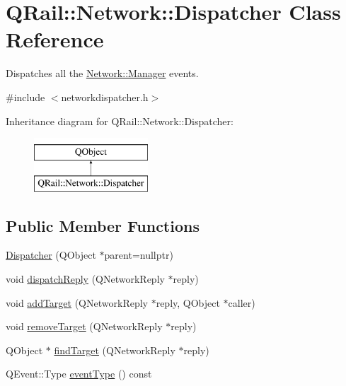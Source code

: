 \hypertarget{classQRail_1_1Network_1_1Dispatcher}{}\section{Q\+Rail\+::Network\+::Dispatcher Class Reference}
\label{classQRail_1_1Network_1_1Dispatcher}


Dispatches all the \mbox{\hyperlink{classQRail_1_1Network_1_1Manager}{Network\+::\+Manager}} events.  




{\ttfamily \#include $<$networkdispatcher.\+h$>$}

Inheritance diagram for Q\+Rail\+::Network\+::Dispatcher\+:\begin{figure}[H]
\begin{center}
\leavevmode
\includegraphics[height=2.000000cm]{classQRail_1_1Network_1_1Dispatcher}
\end{center}
\end{figure}
\subsection*{Public Member Functions}
\begin{DoxyCompactItemize}
\item 
\mbox{\hyperlink{classQRail_1_1Network_1_1Dispatcher_a4b34af3aa56d23755418821f1fc99a29}{Dispatcher}} (Q\+Object $\ast$parent=nullptr)
\item 
void \mbox{\hyperlink{classQRail_1_1Network_1_1Dispatcher_a2b9513eed3f30a28947a5cca87a667d4}{dispatch\+Reply}} (Q\+Network\+Reply $\ast$reply)
\item 
void \mbox{\hyperlink{classQRail_1_1Network_1_1Dispatcher_a608a8218cae5952ba46aec92d5bc5341}{add\+Target}} (Q\+Network\+Reply $\ast$reply, Q\+Object $\ast$caller)
\item 
void \mbox{\hyperlink{classQRail_1_1Network_1_1Dispatcher_a5733f3e85bac53d7c480787ba8d0a350}{remove\+Target}} (Q\+Network\+Reply $\ast$reply)
\item 
Q\+Object $\ast$ \mbox{\hyperlink{classQRail_1_1Network_1_1Dispatcher_afc4be4bc2b68eb5bc9e307120462c280}{find\+Target}} (Q\+Network\+Reply $\ast$reply)
\item 
Q\+Event\+::\+Type \mbox{\hyperlink{classQRail_1_1Network_1_1Dispatcher_a543add8c9e2850b0de01848a9b22fa10}{event\+Type}} () const
\end{DoxyCompactItemize}


